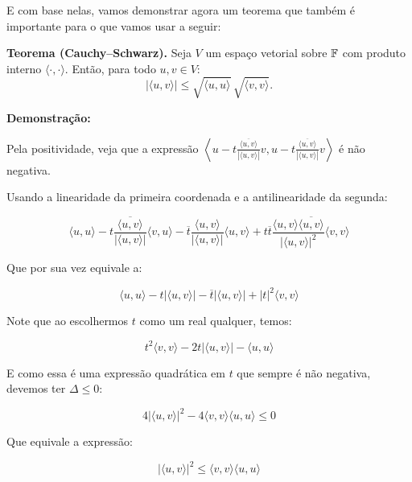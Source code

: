 \documentclass[11pt, a4paper]{article}
\begin{document}
E com base nelas, vamos demonstrar agora um teorema que também é importante para o que vamos usar a seguir:

\textbf{Teorema (Cauchy–Schwarz).} Seja \(V\) um espaço vetorial sobre \(\mathbb{F}\) com produto interno \(\langle\cdot,\cdot\rangle\). Então, para todo \(u,v\in V\):
\[
|\langle u,v\rangle|\le\sqrt{\langle u,u\rangle}\,\sqrt{\langle v,v\rangle}.
\]

\void[-1]

\textbf{Demonstração:}

Pela positividade, veja que a expressão \( \displaystyle \left\langle u-t\frac{\overline{\langle u,v\rangle}}{|\langle u,v \rangle|}v , u-t\frac{\overline{\langle u,v\rangle}}{|\langle u,v \rangle|}v \right\rangle\) é não negativa.

Usando a linearidade da primeira coordenada e a antilinearidade da segunda:

\void[-0.5]

\[\langle u,u \rangle -t\frac{\overline{\langle u,v \rangle}}{|\langle u,v \rangle|}\langle v,u \rangle-\overline{t}\frac{\langle u,v \rangle}{|\langle u,v \rangle|}\langle u,v\rangle+t\overline{t}\frac{\langle u,v \rangle\overline{\langle u,v \rangle}}{|\langle u,v \rangle|^2}\langle v,v \rangle\]

\void[-0.5]

Que por sua vez equivale a:

\void[-1.5]

\[\langle u,u \rangle -t|\langle u,v \rangle|-\overline{t}|\langle u,v \rangle|+|t|^2\langle v,v \rangle\]

\void[-0.5]

Note que ao escolhermos \(t\) como um real qualquer, temos:

\void[-1.2]

\[t^2\langle v,v \rangle -2t|\langle u,v \rangle|-\langle u,u \rangle\]

\void[-0.5]

E como essa é uma expressão quadrática em \(t\) que sempre é não negativa, devemos ter \(\Delta \leq 0\):

\void[-1.2]

\[4|\langle u,v\rangle|^2-4\langle v,v\rangle \langle u,u \rangle \leq 0\]

\void[-0.5]

Que equivale a expressão:

\void[-1.5]

\[|\langle u,v\rangle|^2 \leq \langle v,v \rangle \langle u,u \rangle\]
\end{document}
